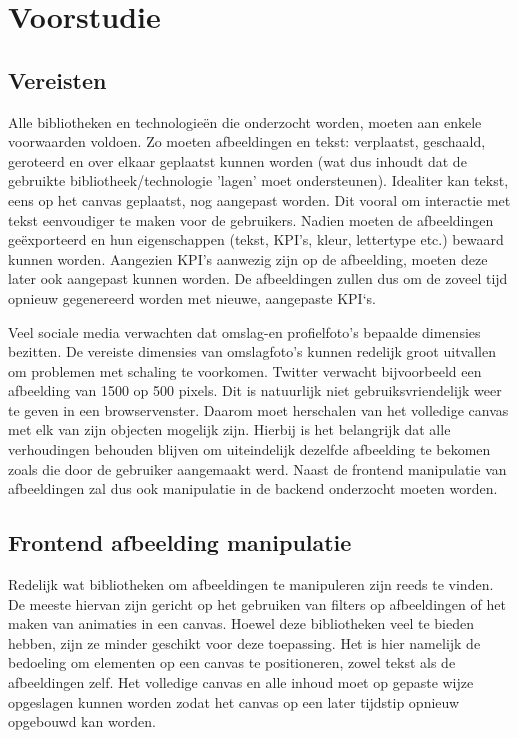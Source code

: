 
\chapter{Voorstudie}
\vspace{-3cm}
\section{Vereisten} \label{vereisten}
Alle bibliotheken en technologie\"{e}n die onderzocht worden, moeten aan enkele voorwaarden voldoen. Zo moeten afbeeldingen en tekst: verplaatst, geschaald, geroteerd en over elkaar geplaatst kunnen worden (wat dus inhoudt dat de gebruikte bibliotheek/technologie 'lagen' moet ondersteunen). Idealiter kan tekst, eens op het canvas geplaatst, nog aangepast worden. Dit vooral om interactie met tekst eenvoudiger te maken voor de gebruikers. Nadien moeten de afbeeldingen ge\"{e}xporteerd en hun eigenschappen (tekst, KPI's, kleur, lettertype etc.) bewaard kunnen worden. Aangezien KPI's aanwezig zijn op de afbeelding, moeten deze later ook aangepast kunnen worden. De afbeeldingen zullen dus om de zoveel tijd opnieuw gegenereerd worden met nieuwe, aangepaste KPI`s. 

Veel sociale media verwachten dat omslag-en profielfoto's bepaalde dimensies bezitten. De vereiste dimensies van omslagfoto's kunnen redelijk groot uitvallen om problemen met schaling te voorkomen. Twitter verwacht bijvoorbeeld een afbeelding van 1500 op 500 pixels. Dit is natuurlijk niet gebruiksvriendelijk weer te geven in een browservenster. Daarom moet herschalen van het volledige canvas met elk van zijn objecten mogelijk zijn. Hierbij is het belangrijk dat alle verhoudingen behouden blijven om uiteindelijk dezelfde afbeelding te bekomen zoals die door de gebruiker aangemaakt werd. Naast de frontend manipulatie van afbeeldingen zal dus ook manipulatie in de backend onderzocht moeten worden.  

\section{Frontend afbeelding manipulatie}
Redelijk wat bibliotheken om afbeeldingen te manipuleren zijn reeds te vinden. De meeste hiervan zijn gericht op het gebruiken van filters op afbeeldingen of het maken van animaties in een canvas. Hoewel deze bibliotheken veel te bieden hebben, zijn ze minder geschikt voor deze toepassing. Het is hier namelijk de bedoeling om elementen op een canvas te positioneren, zowel tekst als de afbeeldingen zelf. Het volledige canvas en alle inhoud moet op gepaste wijze opgeslagen kunnen worden zodat het canvas op een later tijdstip opnieuw opgebouwd kan worden. 

